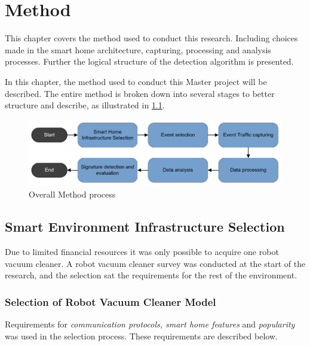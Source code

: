 \chapter{Method}
\label{cap:Method}
This chapter covers the method used to conduct this research. Including choices made in the smart home architecture, capturing, processing and analysis processes. Further the logical structure of the detection algorithm is presented. 

In this chapter, the method used to conduct this Master project will be described. The entire method is broken down into several stages to better structure and describe, as illustrated in  \ref{fig:Method_process}.  

\begin{figure}[H]
    \centering
    \includegraphics[width=\textwidth]{figures/Method_process.png}
    \caption{Overall Method process}
    \label{fig:Method_process}
\end{figure}



\section{Smart Environment Infrastructure Selection}
Due to limited financial resources it was only possible to acquire one robot vacuum cleaner. A robot vacuum cleaner survey was conducted at the start of the research, and the selection sat the requirements for the rest of the environment.  

\subsection{Selection of Robot Vacuum Cleaner Model}
Requirements for \textit{communication protocols, smart home features} and \textit{popularity} was used in the selection process. These requirements are described below.  

